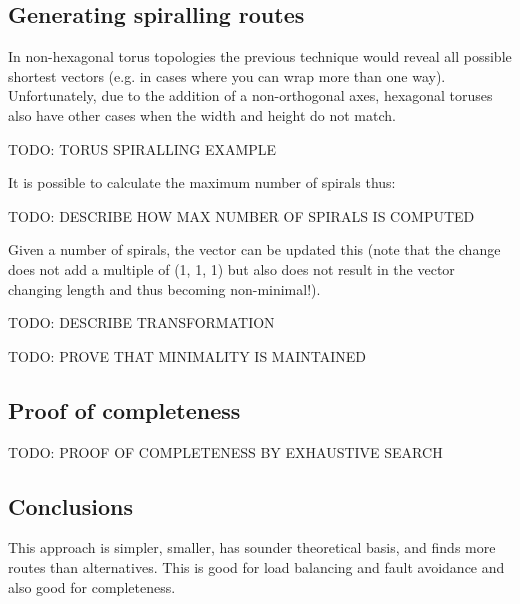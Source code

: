 		\subsection{Generating spiralling routes}
			
			In non-hexagonal torus topologies the previous technique would reveal all
			possible shortest vectors (e.g. in cases where you can wrap more than one
			way). Unfortunately, due to the addition of a non-orthogonal axes,
			hexagonal toruses also have other cases when the width and height do not
			match.
			
			TODO: TORUS SPIRALLING EXAMPLE
			
			It is possible to calculate the maximum number of spirals thus:
			
			TODO: DESCRIBE HOW MAX NUMBER OF SPIRALS IS COMPUTED
			
			Given a number of spirals, the vector can be updated this (note that the
			change does not add a multiple of (1, 1, 1) but also does not result in
			the vector changing length and thus becoming non-minimal!).
			
			TODO: DESCRIBE TRANSFORMATION
			
			TODO: PROVE THAT MINIMALITY IS MAINTAINED
		
		\subsection{Proof of completeness}
		
			TODO: PROOF OF COMPLETENESS BY EXHAUSTIVE SEARCH
	
		\subsection{Conclusions}
			
			This approach is simpler, smaller, has sounder theoretical basis, and
			finds more routes than alternatives. This is good for load balancing and
			fault avoidance and also good for completeness.

